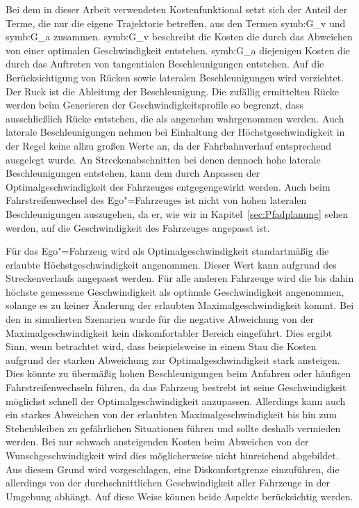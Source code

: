 Bei dem in dieser Arbeit verwendeten Kostenfunktional setzt sich der Anteil der Terme, die nur die eigene Trajektorie betreffen, aus den Termen \gls{symb:G_v} und \gls{symb:G_a} zusammen.
\gls{symb:G_v} beschreibt die Kosten die durch das Abweichen von einer optimalen Geschwindigkeit entstehen.
\gls{symb:G_a} diejenigen Kosten die durch das Auftreten von tangentialen Beschleunigungen entstehen.
Auf die Ber\"ucksichtigung von R\"ucken sowie lateralen Beschleunigungen wird verzichtet.
Der Ruck ist die Ableitung der Beschleunigung.
Die zuf\"allig ermittelten R\"ucke werden beim Generieren der Geschwindigkeitsprofile so begrenzt, dass ausschlie{\ss}lich R\"ucke entstehen, die als angenehm wahrgenommen werden.
Auch laterale Beschleunigungen nehmen bei Einhaltung der H\"ochstgeschwindigkeit in der Regel keine allzu gro{\ss}en Werte an, da der Fahrbahnverlauf entsprechend ausgelegt wurde.
An Streckenabschnitten bei denen dennoch hohe laterale Beschleunigungen entstehen, kann dem durch Anpassen der Optimalgeschwindigkeit des Fahrzeuges entgegengewirkt werden.
Auch beim Fahrstreifenwechsel des Ego"=Fahrzeuges ist nicht von hohen lateralen Beschleunigungen auszugehen, da er, wie wir in Kapitel~\ref{sec:Pfadplanung} sehen werden, auf die Geschwindigkeit des Fahrzeuges angepasst ist.

F\"ur das Ego"=Fahrzeug wird als Optimalgeschwindigkeit standartm\"a{\ss}ig die erlaubte H\"ochstgeschwindigkeit angenommen.
Dieser Wert kann aufgrund des Streckenverlaufs angepasst werden.
F\"ur alle anderen Fahrzeuge wird die bis dahin h\"ochste gemessene Geschwindigkeit als optimale Geschwindigkeit angenommen, solange es zu keiner \"Anderung der erlaubten Maximalgeschwindigkeit kommt.
Bei den in \cite{Naumann2017towards} simulierten Szenarien wurde f\"ur die negative Abweichung von der Maximalgeschwindigkeit kein diskomfortabler Bereich eingef\"uhrt.
Dies ergibt Sinn, wenn betrachtet wird, dass beispielsweise in einem Stau die Kosten aufgrund der starken Abweichung zur Optimalgeschwindigkeit stark ansteigen.
Dies k\"onnte zu \"uberm\"a{\ss}ig hohen Beschleunigungen beim Anfahren oder h\"aufigen Fahrstreifenwechseln f\"uhren, da das Fahrzeug bestrebt ist seine Geschwindigkeit m\"oglichst schnell der Optimalgeschwindigkeit anzupassen.
Allerdings kann auch ein starkes Abweichen von der erlaubten Maximalgeschwindigkeit bis hin zum Stehenbleiben zu gef\"ahrlichen Situationen f\"uhren und sollte deshalb vermieden werden.
Bei nur schwach ansteigenden Kosten beim Abweichen von der Wunschgeschwindigkeit wird dies m\"oglicherweise nicht hinreichend abgebildet.
Aus diesem Grund wird vorgeschlagen, eine Diskomfortgrenze einzuf\"uhren, die allerdings von der durchschnittlichen Geschwindigkeit aller Fahrzeuge in der Umgebung abh\"angt.
Auf diese Weise k\"onnen beide Aspekte ber\"ucksichtig werden.

